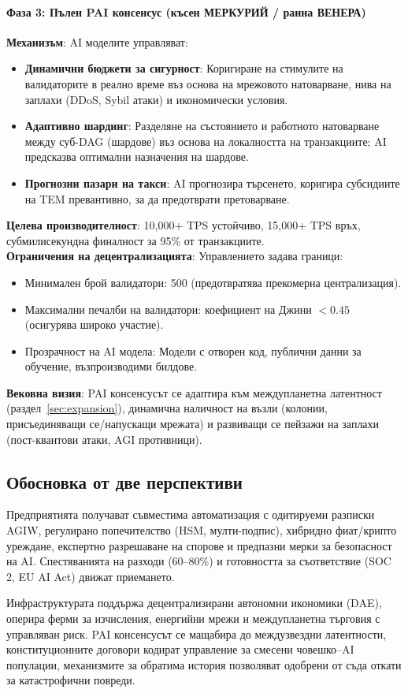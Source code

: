 \documentclass[11pt]{article}
\begin{document}
\paragraph{Фаза 3: Пълен PAI консенсус (късен МЕРКУРИЙ / ранна ВЕНЕРА)}
\textbf{Механизъм}: AI моделите управляват:
\begin{itemize}[noitemsep]
  \item \textbf{Динамични бюджети за сигурност}: Коригиране на стимулите на валидаторите в реално време въз основа на мрежовото натоварване, нива на заплахи (DDoS, Sybil атаки) и икономически условия.
  \item \textbf{Адаптивно шардинг}: Разделяне на състоянието и работното натоварване между суб-DAG (шардове) въз основа на локалността на транзакциите; AI предсказва оптимални назначения на шардове.
  \item \textbf{Прогнозни пазари на такси}: AI прогнозира търсенето, коригира субсидиите на TEM превантивно, за да предотврати претоварване.
\end{itemize}
\textbf{Целева производителност}: 10,000+ TPS устойчиво, 15,000+ TPS връх, субмилисекундна финалност за 95\% от транзакциите.\\
\textbf{Ограничения на децентрализацията}: Управлението задава граници:
\begin{itemize}[noitemsep]
  \item Минимален брой валидатори: 500 (предотвратява прекомерна централизация).
  \item Максимални печалби на валидатори: коефициент на Джини $<0.45$ (осигурява широко участие).
  \item Прозрачност на AI модела: Модели с отворен код, публични данни за обучение, възпроизводими билдове.
\end{itemize}
\textbf{Вековна визия}: PAI консенсусът се адаптира към междупланетна латентност (раздел~\ref{sec:expansion}), динамична наличност на възли (колонии, присъединяващи се/напускащи мрежата) и развиващи се пейзажи на заплахи (пост-квантови атаки, AGI противници).

\subsection{Обосновка от две перспективи}
\begin{description}[style=nextline]
  \item[Краткосрочна (ера МЕРКУРИЙ)] Предприятията получават съвместима автоматизация с одитируеми разписки AGIW, регулирано попечителство (HSM, мулти-подпис), хибридно фиат/крипто уреждане, експертно разрешаване на спорове и предпазни мерки за безопасност на AI. Спестяванията на разходи (60--80\%) и готовността за съответствие (SOC 2, EU AI Act) движат приемането.
  \item[Вековна (от ВЕНЕРА до АНДРОМЕДА)] Инфраструктурата поддържа децентрализирани автономни икономики (DAE), оперира ферми за изчисления, енергийни мрежи и междупланетна търговия с управляван риск. PAI консенсусът се мащабира до междузвездни латентности, конституционните договори кодират управление за смесени човешко--AI популации, механизмите за обратима история позволяват одобрени от съда откати за катастрофични повреди.
\end{description}
\end{document}
